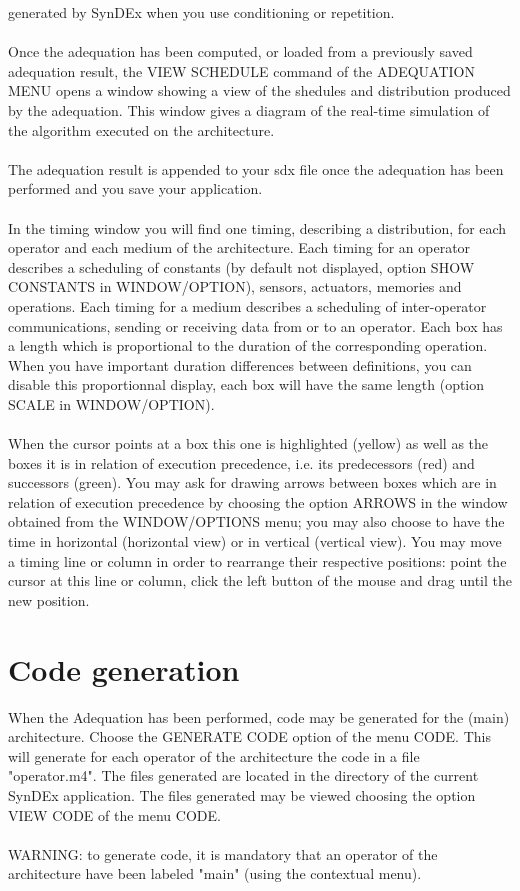 \documentclass[11pt,twoside]{report}
\begin{document}
generated by SynDEx when you use conditioning or repetition.\\\\
Once the adequation has been computed, or loaded from a previously
saved adequation result, the VIEW SCHEDULE command of the ADEQUATION
MENU opens a window showing a view of the shedules and distribution
produced by the adequation. This window gives a diagram of the
real-time simulation of the algorithm executed
on the architecture.\\\\
The adequation result is appended to your sdx file once the adequation
has been performed and you save your application.\\\\
In the timing window you will find one timing, describing a
distribution, for each operator and each medium of the architecture.
Each timing for an operator describes a scheduling of constants (by
default not displayed, option SHOW CONSTANTS in WINDOW/OPTION),
sensors, actuators, memories and operations.  Each timing for a medium
describes a scheduling of inter-operator communications, sending or
receiving data from or to an operator. Each box has a length which is
proportional to the duration of the corresponding operation. When you
have important duration differences between definitions, you can
disable this proportionnal display, each box will have the same length
(option
SCALE in WINDOW/OPTION).\\\\
When the cursor points at a box this one is highlighted (yellow) as
well as the boxes it is in relation of execution precedence, i.e. its
predecessors (red) and successors (green). You may ask for drawing
arrows between boxes which are in relation of execution precedence by
choosing the option ARROWS in the window obtained from the
WINDOW/OPTIONS menu; you may also choose to have the time in
horizontal (horizontal view) or in vertical (vertical view). You may
move a timing line or column in order to rearrange their respective
positions: point the cursor at this line or column, click the left
button of the mouse and drag until the new position.

\chapter{Code generation}
When the Adequation has been performed, code may be generated for the
(main) architecture.  Choose the GENERATE CODE option of the menu
CODE. This will generate for each operator of the architecture the
code in a file "operator.m4". The files generated are located in the
directory of the current SynDEx application. The files generated may
be viewed choosing the option VIEW CODE of the menu CODE.\\\\
WARNING: to generate code, it is mandatory that an operator of the
architecture have been labeled "main" (using the contextual menu).
\end{document}
